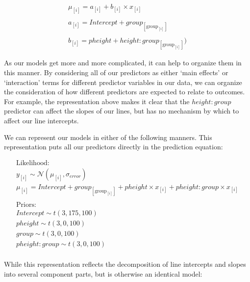 \documentclass[
]{book}
\begin{document}
\begin{equation}
\begin{split}
\mu_{[i]} = a_{[i]} + b_{[i]} \times x_{[i]}  \\\\
a_{[i]} = Intercept + group_{[\mathrm{group}_{[i]}]} \\\\
b_{[i]} = pheight + height \colon group_{[\mathrm{group}_{[i]}]}) 
\end{split}
\label{eq:514}
\end{equation}

As our models get more and more complicated, it can help to organize them in this manner. By considering all of our predictors as either `main effects' or `interaction' terms for different predictor variables in our data, we can organize the consideration of how different predictors are expected to relate to outcomes. For example, the representation above makes it clear that the \(height \colon group\) predictor can affect the slopes of our lines, but has no mechanism by which to affect our line intercepts.

We can represent our models in either of the following manners. This representation puts all our predictors directly in the prediction equation:

\begin{equation}
\begin{split}
\textrm{Likelihood:} \\
y_{[i]} \sim \mathcal{N}(\mu_{[i]},\sigma_{error}) \\
\mu_{[i]} = Intercept + group_{[\mathrm{group}_{[i]}]} + pheight \times x_{[i]} + pheight \colon group \times x_{[i]}  \\ \\
\textrm{Priors:} \\
Intercept \sim t(3, 175, 100) \\
pheight \sim t(3, 0, 100) \\ 
group \sim t(3, 0, 100) \\ 
pheight \colon group \sim t(3, 0, 100) \\ 
\end{split}
\label{eq:515}
\end{equation}

While this representation reflects the decomposition of line intercepts and slopes into several component parts, but is otherwise an identical model:
\end{document}
